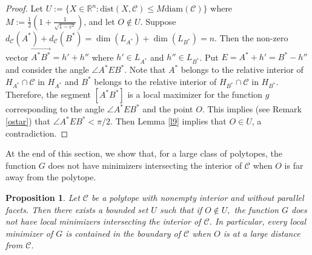 \documentclass[a4paper,12pt]{amsart}
\newtheorem{prop}[thm]{Proposition}
\begin{document}
\begin{proof}
Let $U :=\{X\in\mathbb R^n: \text{dist}(X,
\mathcal C)\le M\text{diam}(\mathcal C)\}$ where $M:=\frac{1}{2}\left(1+\frac{1}{\sqrt{1-c^2}}\right)$, and let $O \not \in U$. Suppose
$d_{\mathcal C}(A^*) + d_{\mathcal C}(B^*)=\dim(L_{A^*}) +\dim(L_{B^*}) = n$.  Then the non-zero vector $\overrightarrow{A^*B^*} = h' + h''$ where $h'\in L_{A^*}$ and $h''\in L_{B^*}$.
Put $E= A^* + h'= B^* - h''$ and consider
the angle $\angle A^*EB^*$. Note that $A^*$ belongs to the relative interior of
$H_{A^*}\cap \mathcal C$ in $H_{A^*}$ and
$B^*$ belongs to the relative interior of
$H_{B^*}\cap \mathcal C$ in $H_{B^*}$. Therefore, the segment $[A^*B^*]$ is a local
maximizer for the function $g$ corresponding to the angle $\angle A^*EB^*$ and the point $O$.
This implies (see Remark \ref{ostar}) that
$\angle A^*EB^*<\pi/2$. Then Lemma \ref{l9} implies that $O \in U$, a contradiction.

\end{proof}

At the end of this section, we show that, for a large class of polytopes, the function $G$ does not have
minimizers intersecting the interior of $\mathcal C$ when $O$ is far away from the polytope.

\begin {prop}
Let $\mathcal C$ be a polytope with nonempty interior and without parallel facets. Then there exists a bounded set $U$ such that if $O\not\in U,$ the function $G$ does not have local minimizers intersecting the interior of $\mathcal C$. In particular, every local minimizer of $G$ is contained in the boundary of $\mathcal C$ when $O$ is at a large distance from $\mathcal C$.
\end{prop}
\end{document}
